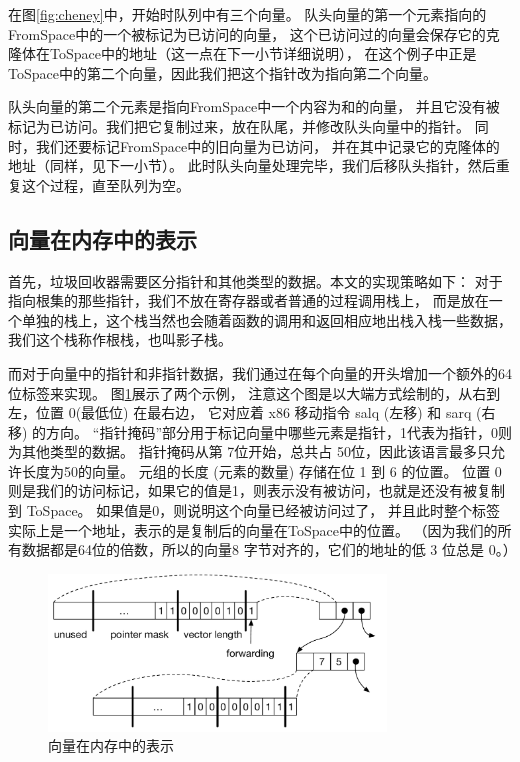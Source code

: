 在图\ref{fig:cheney}中，开始时队列中有三个向量。
队头向量的第一个元素指向的FromSpace中的一个被标记为已访问的向量，
这个已访问过的向量会保存它的克隆体在ToSpace中的地址（这一点在下一小节详细说明），
在这个例子中正是ToSpace中的第二个向量，因此我们把这个指针改为指向第二个向量。

队头向量的第二个元素是指向FromSpace中一个内容为和的向量，
并且它没有被标记为已访问。我们把它复制过来，放在队尾，并修改队头向量中的指针。
同时，我们还要标记FromSpace中的旧向量为已访问，
并在其中记录它的克隆体的地址（同样，见下一小节）。
此时队头向量处理完毕，我们后移队头指针，然后重复这个过程，直至队列为空。


\subsection{向量在内存中的表示}

首先，垃圾回收器需要区分指针和其他类型的数据。本文的实现策略如下：
对于指向根集的那些指针，我们不放在寄存器或者普通的过程调用栈上，
而是放在一个单独的栈上，这个栈当然也会随着函数的调用和返回相应地出栈入栈一些数据，
我们这个栈称作根栈，也叫影子栈。

而对于向量中的指针和非指针数据，我们通过在每个向量的开头增加一个额外的64位标签来实现。
图\ref{fig:tuple-rep}展示了两个示例，
注意这个图是以大端方式绘制的，从右到左，位置 0(最低位) 在最右边，
它对应着 x86 移动指令 salq (左移) 和 sarq (右移) 的方向。
“指针掩码”部分用于标记向量中哪些元素是指针，1代表为指针，0则为其他类型的数据。
指针掩码从第 7位开始，总共占 50位，因此该语言最多只允许长度为50的向量。
元组的长度 (元素的数量) 存储在位 1 到 6 的位置。
位置 0 则是我们的访问标记，如果它的值是1，则表示没有被访问，也就是还没有被复制到 ToSpace。
如果值是0，则说明这个向量已经被访问过了，
并且此时整个标签实际上是一个地址，表示的是复制后的向量在ToSpace中的位置。
（因为我们的所有数据都是64位的倍数，所以的向量8 字节对齐的，它们的地址的低 3 位总是 0。）

\begin{figure}[t]
\centering
\includegraphics[width=0.8\textwidth]{figures/tuple-rep}
\caption{向量在内存中的表示}
\label{fig:tuple-rep}
\end{figure}


